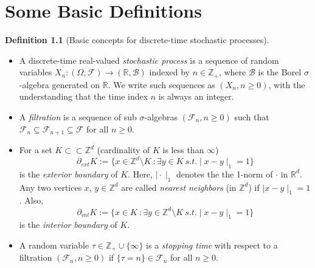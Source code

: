 \documentclass[
11pt, %
a4paper, %
oneside, %
headinclude,footinclude, %
BCOR5mm, %
]{scrartcl}
\begin{document}
\section{Some Basic Definitions}
\textbf{Definition 1.1} (Basic concepts for discrete-time stochastic processes).
\begin{itemize}[noitemsep] %
\item A discrete-time real-valued \textit{stochastic process} is a sequence of random variables $X_n:(\Omega, \mathscr{F}) \to (\mathbb{R}, \mathscr{B})$ indexed by $n \in \mathbb{Z}_+$, where $\mathscr{B}$ is the Borel $\sigma$-algebra generated on $\mathbb{R}$. We write such sequences as $(X_n, n \geq 0)$, with the understanding that the time index $n$ is always an integer.
\item A \textit{filtration} is a sequence of sub $\sigma$-algebras $(\mathscr{F}_n, n \geq 0)$ such that $\mathscr{F}_n \subseteq \mathscr{F}_{n+1} \subseteq \mathscr{F}$ for all $n \geq 0$.
\item For a set $K \subset\subset \mathbb{Z}^d$ (cardinality of $K$ is less than $\infty$)
\begin{equation}
    \partial_{ext}K:=\{x \in \mathbb{Z}^d \setminus K \ : \exists y \in K \ s.t. \mid x-y \mid_1=1 \} \tag{1.1}
\end{equation}
is the \textit{exterior boundary} of $K$. Here, $\mid \cdot \mid_1$ denotes the the 1-norm of $\cdot$ in $\mathbb{R}^d$. Any two vertices $x$, $y \in \mathbb{Z}^d$ are called \textit{nearest neighbors} (in $\mathbb{Z}^d$) if $\mid x-y \mid_1=1$. Also,
\begin{equation}
    \partial_{int}K:=\{x \in K \ : \exists y \in \mathbb{Z}^d \setminus K \ s.t.\mid x-y \mid_1=1 \} \tag{1.2} 
\end{equation}
is the \textit{interior boundary} of $K$.
\item A random variable $\tau \in \mathbb{Z}_+\cup \{\infty\}$ is a \textit{stopping time} with respect to a filtration $(\mathscr{F}_n, n \geq 0)$ if $\{\tau=n\} \in \mathscr{F}_n$ for all $n \geq 0$.
\end{itemize}
\end{document}
